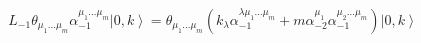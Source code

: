 \begin{equation}
L_{-1}\theta _{\mu _{1}...\mu _{m}}\alpha _{-1}^{\mu _{1}...\mu
_{m}}\left\vert 0,k\right\rangle =\theta _{\mu _{1}...\mu _{m}}(k_{\lambda
}\alpha _{-1}^{\lambda \mu _{1}...\mu _{m}}+m\alpha _{-2}^{\mu _{1}}\alpha
_{-1}^{\mu _{2}...\mu _{m}})\left\vert 0,k\right\rangle  \tag{29}
\end{equation}%
